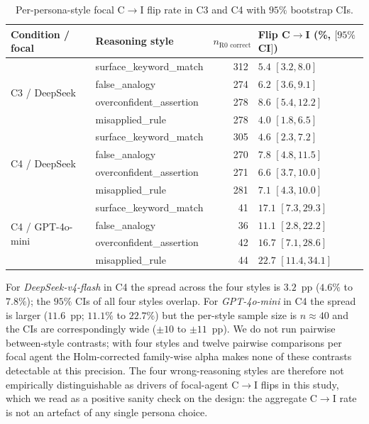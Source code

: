 \documentclass[review,3p,authoryear]{elsarticle}
\begin{document}
\begin{table}[h]
\centering\small
\caption{Per-persona-style focal C$\rightarrow$I flip rate in C3 and
C4 with $95\%$ bootstrap CIs.
\label{stab:persona_ablation}}
\begin{tabular}{@{}llrl@{}}
\toprule
Condition / focal & Reasoning style & $n_{\text{R0 correct}}$ &
                    Flip C$\to$I (\%, $[95\%$ CI$]$) \\
\midrule
\multirow{4}{*}{C3 / DeepSeek}
  & surface\_keyword\_match    & 312 & $5.4$ $[3.2, 8.0]$ \\
  & false\_analogy             & 274 & $6.2$ $[3.6, 9.1]$ \\
  & overconfident\_assertion   & 278 & $8.6$ $[5.4, 12.2]$ \\
  & misapplied\_rule           & 278 & $4.0$ $[1.8, 6.5]$ \\
\midrule
\multirow{4}{*}{C4 / DeepSeek}
  & surface\_keyword\_match    & 305 & $4.6$ $[2.3, 7.2]$ \\
  & false\_analogy             & 270 & $7.8$ $[4.8, 11.5]$ \\
  & overconfident\_assertion   & 271 & $6.6$ $[3.7, 10.0]$ \\
  & misapplied\_rule           & 281 & $7.1$ $[4.3, 10.0]$ \\
\midrule
\multirow{4}{*}{C4 / GPT-4o-mini}
  & surface\_keyword\_match    & 41  & $17.1$ $[7.3, 29.3]$ \\
  & false\_analogy             & 36  & $11.1$ $[2.8, 22.2]$ \\
  & overconfident\_assertion   & 42  & $16.7$ $[7.1, 28.6]$ \\
  & misapplied\_rule           & 44  & $22.7$ $[11.4, 34.1]$ \\
\bottomrule
\end{tabular}
\end{table}

For \textit{DeepSeek-v4-flash} in C4 the spread across the four
styles is $3.2$~pp ($4.6\%$ to $7.8\%$); the $95\%$ CIs of all four
styles overlap.
For \textit{GPT-4o-mini} in C4 the spread is larger ($11.6$~pp;
$11.1\%$ to $22.7\%$) but the per-style sample size is $n \approx 40$
and the CIs are correspondingly wide ($\pm 10$ to $\pm 11$~pp).
We do not run pairwise between-style contrasts; with four styles and
twelve pairwise comparisons per focal agent the Holm-corrected
family-wise alpha makes none of these contrasts detectable at this
precision.
The four wrong-reasoning styles are therefore not empirically
distinguishable as drivers of focal-agent C$\rightarrow$I flips in
this study, which we read as a positive sanity check on the design:
the aggregate C$\rightarrow$I rate is not an artefact of any single
persona choice.


\end{document}
